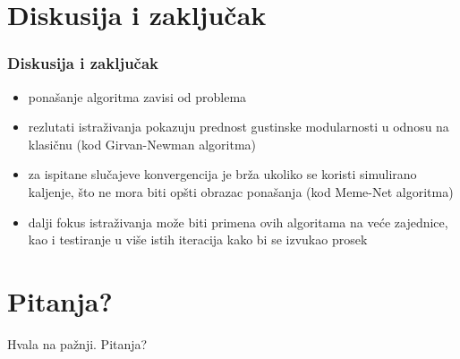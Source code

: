 \documentclass{beamer}
\begin{document}
\section{Diskusija i zaključak} 
\begin{frame}\frametitle{Diskusija i zaključak} 
\begin{itemize}
    \item ponašanje algoritma zavisi od problema
    \item rezlutati istraživanja pokazuju prednost gustinske modularnosti u odnosu na klasičnu (kod Girvan-Newman algoritma)
    \item za ispitane slučajeve konvergencija je brža ukoliko se koristi simulirano kaljenje, što ne mora biti opšti obrazac ponašanja (kod Meme-Net algoritma)
    \item dalji fokus istraživanja može biti primena ovih algoritama na veće zajednice, kao i testiranje u više istih iteracija kako bi se izvukao prosek 
\end{itemize}

\end{frame}

\section{Pitanja?}
\begin{frame}
Hvala na pažnji.
\newline
\vspace{30pt}Pitanja?
\end{frame}



\end{document}
